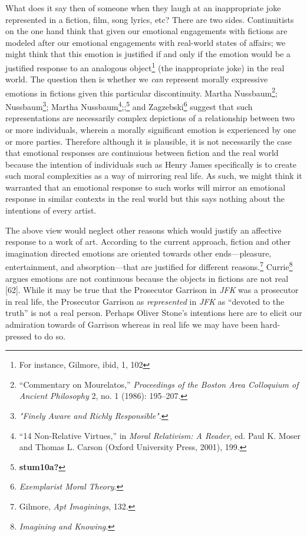 \documentclass[
  12pt,
]{book}
\theoremstyle{definition}
\theoremstyle{definition}
\theoremstyle{definition}
\theoremstyle{definition}
\theoremstyle{remark}
\begin{document}
What does it say then of someone when they laugh at an inappropriate joke represented in a fiction, film, song lyrics, etc? There are two sides. Continuitists on the one hand think that given our emotional engagements with fictions are modeled after our emotional engagements with real-world states of affairs; we might think that this emotion is justified if and only if the emotion would be a justified response to an analogous object\footnote{For instance, Gilmore, ibid, 1, 102} (the inappropriate joke) in the real world. The question then is whether we \emph{can} represent morally expressive emotions in fictions given this particular discontinuity. Martha Nussbaum\footnote{{``Commentary on {Mourelatos},''} \emph{Proceedings of the Boston Area Colloquium of Ancient Philosophy} 2, no. 1 (1986): 195--207.}; Nussbaum\footnote{\emph{"{Finely Aware} and {Richly Responsible}"}.}; Martha Nussbaum\footnote{{``14 {Non-Relative Virtues},''} in \emph{Moral {Relativism}: {A Reader}}, ed. Paul K. Moser and Thomas L. Carson (Oxford University Press, 2001), 199.};;\footnote{\textbf{stum10a?}} and Zagzebski\footnote{\emph{Exemplarist {Moral Theory}}.} suggest that such representations are necessarily complex depictions of a relationship between two or more individuals, wherein a morally significant emotion is experienced by one or more parties. Therefore although it is plausible, it is not necessarily the case that emotional responses are continuious between fiction and the real world because the intention of individuals such as Henry James specifically is to create such moral complexities as a way of mirroring real life. As such, we might think it warranted that an emotional response to such works will mirror an emotional response in similar contexts in the real world but this says nothing about the intentions of every artist.

The above view would neglect other reasons which would justify an affective response to a work of art. According to the current approach, fiction and other imagination directed emotions are oriented towards other ends---pleasure, entertainment, and absorption---that are justified for different reasons.\footnote{Gilmore, \emph{Apt {Imaginings}}, 132.} Currie\footnote{\emph{Imagining and Knowing}.} argues emotions are not continuous because the objects in fictions are not real {[}62{]}. While it may be true that the Prosecutor Garrison in \emph{JFK} was a prosecutor in real life, the Prosecutor Garrison as \emph{represented} in \emph{JFK} as ``devoted to the truth'' is not a real person. Perhaps Oliver Stone's intentions here are to elicit our admiration towards of Garrison whereas in real life we may have been hard-pressed to do so.
\end{document}

